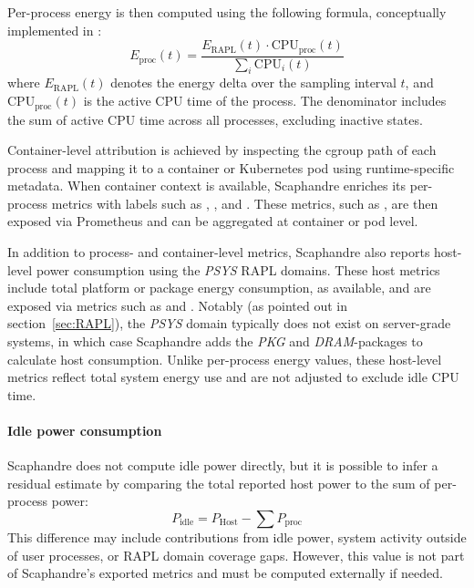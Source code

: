 Per-process energy is then computed using the following formula, conceptually implemented in :
\begin{equation}
E_{\text{proc}}(t) = \frac{E_{\text{RAPL}}(t) \cdot \text{CPU}_{\text{proc}}(t)}{\sum_i \text{CPU}_i(t)}
\end{equation}
where \( E_{\text{RAPL}}(t) \) denotes the energy delta over the sampling interval \( t \), and \( \text{CPU}_{\text{proc}}(t) \) is the active CPU time of the process. The denominator includes the sum of active CPU time across all processes, excluding inactive states.

Container-level attribution is achieved by inspecting the cgroup path of each process and mapping it to a container or Kubernetes pod using runtime-specific metadata. When container context is available, Scaphandre enriches its per-process metrics with labels such as , , and . These metrics, such as , are then exposed via Prometheus and can be aggregated at container or pod level.

In addition to process- and container-level metrics, Scaphandre also reports host-level power consumption using the \textit{PSYS} RAPL domains. These host metrics include total platform or package energy consumption, as available, and are exposed via metrics such as  and . Notably (as pointed out in section~\ref{sec:RAPL}), the \textit{PSYS} domain typically does not exist on server-grade systems, in which case Scaphandre adds the \textit{PKG} and \textit{DRAM}-packages to calculate host consumption. Unlike per-process energy values, these host-level metrics reflect total system energy use and are not adjusted to exclude idle CPU time.

\paragraph{Idle power consumption}
Scaphandre does not compute idle power directly, but it is possible to infer a residual estimate by comparing the total reported host power to the sum of per-process power:
\[
P_{\text{idle}} = P_{\text{Host}} - \sum P_{\text{proc}}
\]
This difference may include contributions from idle power, system activity outside of user processes, or RAPL domain coverage gaps. However, this value is not part of Scaphandre’s exported metrics and must be computed externally if needed.

